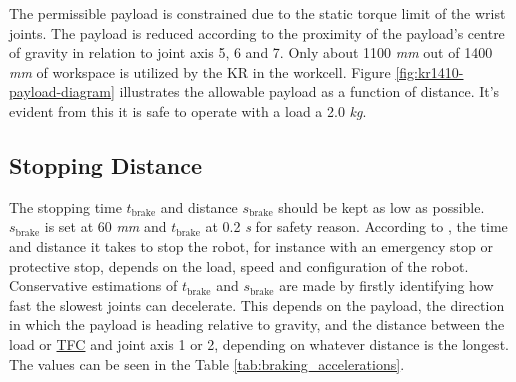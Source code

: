 The permissible payload is constrained due to the static torque limit of the wrist joints. The payload is
reduced according to the proximity of the payload's centre of gravity in relation to joint axis 5, 6 and 7. \cite[page 35]{kassow-manual}
Only about 1100 \textit{mm} out of 1400 \textit{mm} of workspace is utilized by the KR in the workcell. 
Figure \ref{fig:kr1410-payload-diagram}
illustrates the allowable payload as a function of distance. It's evident from this it is safe to operate with a load a 2.0 \textit{kg}.

\subsection{Stopping Distance}
\label{subsec:stoppage-distance}
The stopping time \hyperref[sym:t-brake]{$t_{\text{brake}}$} and distance \hyperref[sym:s-brake]{$s_{\text{brake}}$} should be kept as low as possible. \hyperref[sym:s-brake]{$s_{\text{brake}}$} is set at 60 \textit{mm} and \hyperref[sym:t-brake]{$t_{\text{brake}}$} at 0.2 \textit{s} for safety reason.
According to \cite[page 35]{kassow-manual}, the time and distance it takes to stop the robot, for instance with an emergency stop or protective stop, depends on the load, speed
and configuration of the robot. Conservative estimations of \hyperref[sym:t-brake]{$t_{\text{brake}}$} and \hyperref[sym:s-brake]{$s_{\text{brake}}$} are made by firstly identifying how fast the
slowest joints can decelerate. This depends on the payload, the direction in which the payload is heading
relative to gravity, and the distance between the load or \hyperref[acro:TFC]{TFC} and joint axis 1 or 2, depending on whatever
distance is the longest.
The values can be seen in the Table \ref{tab:braking_accelerations}.


